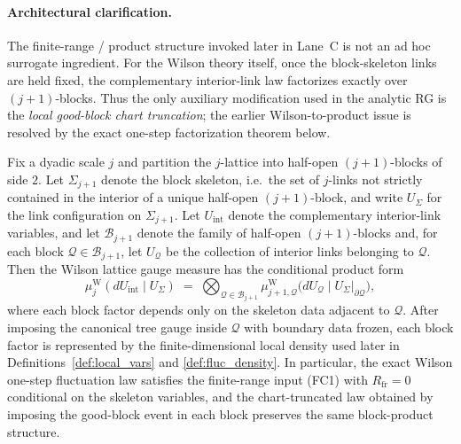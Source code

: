 \paragraph{Architectural clarification.}
The finite-range / product structure invoked later in Lane~C is not an ad hoc surrogate ingredient.
For the Wilson theory itself, once the block-skeleton links are held fixed, the complementary interior-link law factorizes exactly over $(j+1)$-blocks.
Thus the only auxiliary modification used in the analytic RG is the \emph{local good-block chart truncation}; the earlier Wilson-to-product issue is resolved by the exact one-step factorization theorem below.

\begin{theorem}\label{thm:wilson_one_step_factorization}
Fix a dyadic scale $j$ and partition the $j$-lattice into half-open $(j+1)$-blocks of side $2$.
Let $\Sigma_{j+1}$ denote the block skeleton, i.e.\ the set of $j$-links not strictly contained in the interior of a unique half-open $(j+1)$-block, and write $U_{\Sigma}$ for the link configuration on $\Sigma_{j+1}$.
Let $U_{\mathrm{int}}$ denote the complementary interior-link variables, and let $\mathcal B_{j+1}$ denote the family of half-open $(j+1)$-blocks and, for each block $\mathcal Q\in \mathcal B_{j+1}$, let $U_{\mathcal Q}$ be the collection of interior links belonging to $\mathcal Q$.
Then the Wilson lattice gauge measure has the conditional product form
\begin{equation}\label{eq:wilson_block_factorization}
\mu^{\mathrm W}_{j}(dU_{\mathrm{int}}\mid U_{\Sigma})
\;=\;
\bigotimes_{\mathcal Q\in \mathcal B_{j+1}} \mu^{\mathrm W}_{j+1,\mathcal Q}\bigl(dU_{\mathcal Q}\mid U_{\Sigma}|_{\partial \mathcal Q}\bigr),
\end{equation}
where each block factor depends only on the skeleton data adjacent to $\mathcal Q$.
After imposing the canonical tree gauge inside $\mathcal Q$ with boundary data frozen, each block factor is represented by the finite-dimensional local density used later in Definitions~\ref{def:local_vars} and \ref{def:fluc_density}.
In particular, the exact Wilson one-step fluctuation law satisfies the finite-range input \textup{(FC1)} with $R_{\mathrm{fr}}=0$ conditional on the skeleton variables, and the chart-truncated law obtained by imposing the good-block event in each block preserves the same block-product structure.
\end{theorem}

